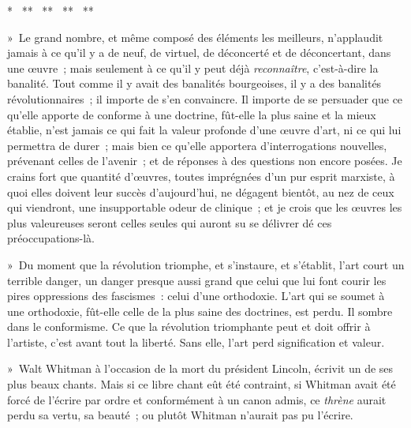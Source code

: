 \documentclass[french,twoside]{book} %
\begin{document}
{\centering \noindent **  **  **  **  **\par}
\noindent » Le grand nombre, et même composé des éléments les meilleurs, n’applaudit jamais à ce qu’il y a de neuf, de virtuel, de déconcerté et de déconcertant, dans une œuvre ; mais seulement à ce qu’il y peut déjà \emph{reconnaître}, c’est-à-dire la banalité. Tout comme il y avait des banalités bourgeoises, il y a des banalités révolutionnaires ; il importe de s’en convaincre. Il importe de se persuader que ce qu’elle apporte de conforme à une doctrine, fût-elle la plus saine et la mieux établie, n’est jamais ce qui fait la valeur profonde d’une œuvre d’art, ni ce qui lui permettra de durer ; mais bien ce qu’elle apportera d’interrogations nouvelles, prévenant celles de l’avenir ; et de réponses à des questions non encore posées. Je crains fort que quantité d’œuvres, toutes imprégnées d’un pur esprit marxiste, à quoi elles doivent leur succès d’aujourd’hui, ne dégagent bientôt, au nez de ceux qui viendront, une insupportable odeur de clinique ; et je crois que les œuvres les plus valeureuses seront celles seules qui auront su se délivrer dé ces préoccupations-là.\par
» Du moment que la révolution triomphe, et s’instaure, et s’établit, l’art court un terrible danger, un danger presque aussi grand que celui que lui font courir les pires oppressions des fascismes : celui d’une orthodoxie. L’art qui se soumet à une orthodoxie, fût-elle celle de la plus saine des doctrines, est perdu. Il sombre dans le conformisme. Ce que la révolution triomphante peut et doit offrir à l’artiste, c’est avant tout la liberté. Sans elle, l’art perd signification et valeur.\par
» Walt Whitman à l’occasion de la mort du président Lincoln, écrivit un de ses plus beaux chants. Mais si ce libre chant eût été contraint, si Whitman avait été forcé de l’écrire par ordre et conformément à un canon admis, ce \emph{thrène} aurait perdu sa vertu, sa beauté ; ou plutôt Whitman n’aurait pas pu l’écrire.\par
\end{document}
